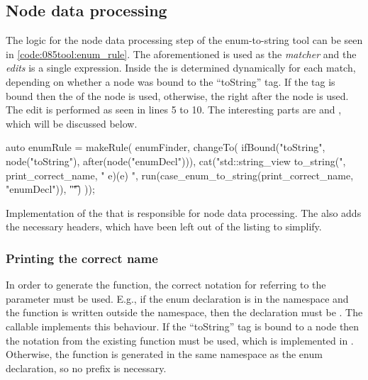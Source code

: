 \subsection{Node data processing} \label{subsec:080dev:085example:050enum:node_processing}
The logic for the node data processing step of the enum-to-string tool can be seen in \cref{code:085tool:enum_rule}.
The aforementioned  is used as the \textit{matcher} and the \textit{edits} is a single  expression.
Inside  the  is determined dynamically for each match, depending on whether a node was bound to the ``toString'' tag. If the tag is bound then the  of the node is used, otherwise, the  right after the  node is used.
The edit is performed as seen in lines 5 to 10. The interesting parts are  and , which will be discussed below.

\begin{listing}[H]
    \begin{cppcode}
auto enumRule = makeRule(
    enumFinder,
    changeTo(
        ifBound("toString", node("toString"), after(node("enumDecl"))),
        cat("\n\nconstexpr std::string_view to_string(",
            print_correct_name,
            " e){\n\tswitch(e) {\n",
            run(case_enum_to_string(print_correct_name, "enumDecl")),
            "\t}\n}")
    ));
    \end{cppcode}
    \caption{Implementation of the  that is responsible for node data processing. The  also adds the necessary headers, which have been left out of the listing to simplify.}
    \label{code:085tool:enum_rule}
\end{listing}

\subsubsection*{Printing the correct name}
In order to generate the  function, the correct notation for referring to the parameter must be used. E.g., if the enum declaration  is in the namespace  and the  function is written outside the namespace, then the declaration must be .
The callable  implements this behaviour.
If the ``toString'' tag is bound to a node then the notation from the existing  function must be used, which is implemented in  
.
Otherwise, the  function is generated in the same namespace as the enum declaration, so no prefix is necessary.


